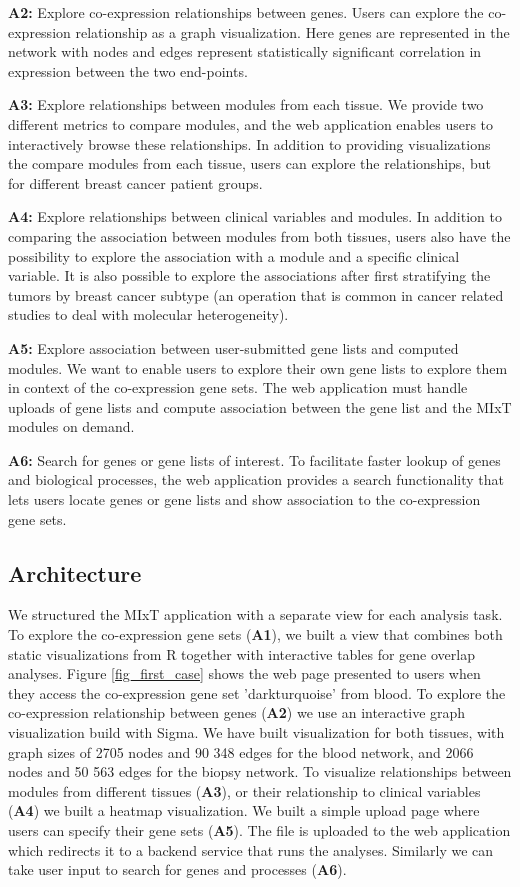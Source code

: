 \textbf{A2:} Explore co-expression relationships between genes. Users can
explore the co-expression relationship as a graph visualization. 
Here genes are represented in the network with nodes and edges represent 
statistically significant correlation in expression between the two end-points. 

\textbf{A3:} Explore relationships between modules from each tissue. We provide
two different metrics to compare modules, and the web application enables users
to interactively browse these relationships.  In addition to providing
visualizations the compare modules from each tissue, users can explore the
relationships, but for different breast cancer patient groups. 

\textbf{A4:} Explore relationships between clinical variables and modules. In
addition to comparing the association between modules from both tissues, users
also have the possibility to explore the association with a module and a
specific clinical variable. It is also possible to explore the associations
after first stratifying the tumors by breast cancer subtype (an operation that
is common in cancer related studies to deal with molecular heterogeneity).

\textbf{A5:} Explore association between user-submitted gene lists and computed
modules. We want to enable users to explore their own gene lists to explore
them in context of the co-expression gene sets. The web application must handle
uploads of gene lists and compute association between the gene list and the MIxT
modules on demand. 

\textbf{A6:} Search for genes or gene lists of interest. To facilitate faster
lookup of genes and biological processes, the web application provides a search
functionality that lets users locate genes or gene lists and show association to
the co-expression gene sets. 

\subsection{Architecture} 
We structured the MIxT application with a separate view for each analysis task.
To explore the co-expression gene sets (\textbf{A1}), we built a view that
combines both static visualizations from R together with interactive tables for
gene overlap analyses. Figure \ref{fig_first_case} shows the web page presented
to users when they access the co-expression gene set 'darkturquoise' from blood.
To explore the co-expression relationship between genes (\textbf{A2}) we use an
interactive graph visualization build with Sigma.\cite{sigmajs}
We have built visualization for both tissues, with graph sizes of 2705 nodes and
90 348 edges for the blood network, and 2066 nodes and 50 563 edges for the
biopsy network. 
To visualize relationships between modules from different tissues (\textbf{A3}),
or their relationship to clinical variables (\textbf{A4}) we built a heatmap
visualization.
We built a simple upload page where users can specify their gene sets
(\textbf{A5}). The file is uploaded to the web application which redirects it to
a backend service that runs the analyses. Similarly we can take user input to
search for genes and processes (\textbf{A6}).

